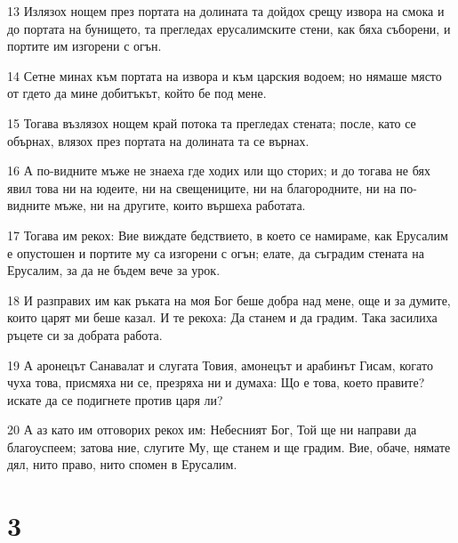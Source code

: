 \par 13 Излязох нощем през портата на долината та дойдох срещу извора на смока и до портата на бунището, та прегледах ерусалимските стени, как бяха съборени, и портите им изгорени с огън.
\par 14 Сетне минах към портата на извора и към царския водоем; но нямаше място от гдето да мине добитъкът, който бе под мене.
\par 15 Тогава възлязох нощем край потока та прегледах стената; после, като се обърнах, влязох през портата на долината та се върнах.
\par 16 А по-видните мъже не знаеха где ходих или що сторих; и до тогава не бях явил това ни на юдеите, ни на свещениците, ни на благородните, ни на по-видните мъже, ни на другите, които вършеха работата.
\par 17 Тогава им рекох: Вие виждате бедствието, в което се намираме, как Ерусалим е опустошен и портите му са изгорени с огън; елате, да съградим стената на Ерусалим, за да не бъдем вече за урок.
\par 18 И разправих им как ръката на моя Бог беше добра над мене, още и за думите, които царят ми беше казал. И те рекоха: Да станем и да градим. Така засилиха ръцете си за добрата работа.
\par 19 А аронецът Санавалат и слугата Товия, амонецът и арабинът Гисам, когато чуха това, присмяха ни се, презряха ни и думаха: Що е това, което правите? искате да се подигнете против царя ли?
\par 20 А аз като им отговорих рекох им: Небесният Бог, Той ще ни направи да благоуспеем; затова ние, слугите Му, ще станем и ще градим. Вие, обаче, нямате дял, нито право, нито спомен в Ерусалим.

\chapter{3}

